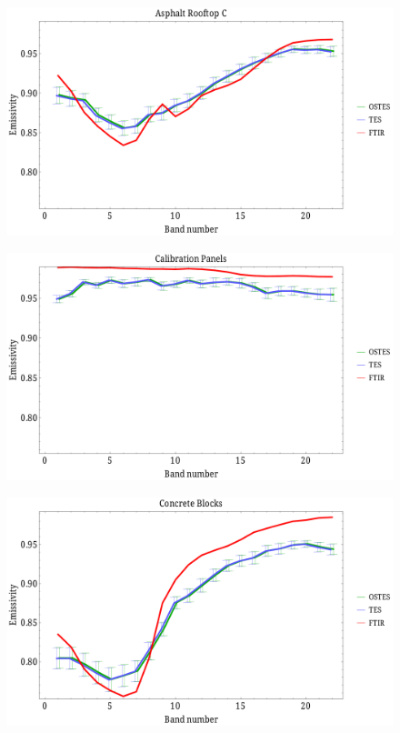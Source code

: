 \documentclass[xcolor=dvipsnames]{beamer}
\begin{document}
\begin{frame}[plain]{}
\begin{figure}[htb]
	\centering
	\includegraphics[scale=0.35]{AsphaltRooftopC.pdf}
\end{figure}
\end{frame}

\begin{frame}[plain]{}
\begin{figure}[htb]
	\centering
	\includegraphics[scale=0.35]{CalibrationPanels.pdf}
\end{figure}
\end{frame}

\begin{frame}[plain]{}
\begin{figure}[htb]
	\centering
	\includegraphics[scale=0.35]{ConcreteBlocks.pdf}
\end{figure}
\end{frame}
\end{document}
